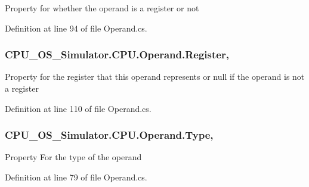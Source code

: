 Property for whether the operand is a register or not 



Definition at line 94 of file Operand.\+cs.

\hypertarget{class_c_p_u___o_s___simulator_1_1_c_p_u_1_1_operand_a8f08360f0e27922fc0377f5d58a9e67f}{}
\subsubsection[{Register}]{ C\+P\+U\+\_\+\+O\+S\+\_\+\+Simulator.\+C\+P\+U.\+Operand.\+Register\hspace{0.3cm}{\ttfamily [get]}, {\ttfamily [set]}}\label{class_c_p_u___o_s___simulator_1_1_c_p_u_1_1_operand_a8f08360f0e27922fc0377f5d58a9e67f}


Property for the register that this operand represents or null if the operand is not a register 



Definition at line 110 of file Operand.\+cs.

\hypertarget{class_c_p_u___o_s___simulator_1_1_c_p_u_1_1_operand_a0b0deae57b760df3a083dc54535b0891}{}
\subsubsection[{Type}]{ C\+P\+U\+\_\+\+O\+S\+\_\+\+Simulator.\+C\+P\+U.\+Operand.\+Type\hspace{0.3cm}{\ttfamily [get]}, {\ttfamily [set]}}\label{class_c_p_u___o_s___simulator_1_1_c_p_u_1_1_operand_a0b0deae57b760df3a083dc54535b0891}


Property For the type of the operand 



Definition at line 79 of file Operand.\+cs.

\hypertarget{class_c_p_u___o_s___simulator_1_1_c_p_u_1_1_operand_ab109292eba2094db4d7f21cbdbd5bc9e}{}
